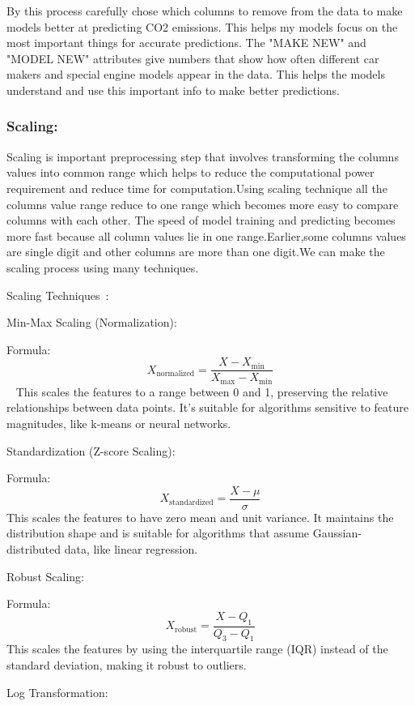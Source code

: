 \documentclass[12pt, a4paper,oneside]{book}
\numberwithin{equation}{section}
\begin{document}
By this process carefully chose which columns to remove from the data to make  models better at predicting CO2 emissions. This helps my models focus on the most important things for accurate predictions. The "MAKE NEW" and "MODEL NEW" attributes give numbers that show how often different car makers and special engine models appear in the data. This helps the models understand and use this important info to make better predictions.

\subsubsection{Scaling:}

Scaling is important preprocessing step that involves transforming the columns values into common range which helps to reduce the computational power requirement and reduce time for computation.Using scaling technique all the columns value range reduce to one range which becomes more easy to compare columns with each other. The speed of model training and predicting becomes more fast because all column values lie in one range.Earlier,some columns values are single digit and other columns are more than one digit.We can make the scaling process using many techniques.

\hfill\break
Scaling Techniques~\cite{ref17}:

\hfill\break
Min-Max Scaling (Normalization):

Formula:
\[
X_{\text{normalized}} = \frac{X - X_{\text{min}}}{X_{\text{max}} - X_{\text{min}}}
\]~\cite{ref17}
This scales the features to a range between 0 and 1, preserving the relative relationships between data points. It's suitable for algorithms sensitive to feature magnitudes, like k-means or neural networks.
\hfill\break

Standardization (Z-score Scaling):

Formula:
\[
X_{\text{standardized}} = \frac{X - \mu}{\sigma}
\]
This scales the features to have zero mean and unit variance. It maintains the distribution shape and is suitable for algorithms that assume Gaussian-distributed data, like linear regression.

\hfill\break
Robust Scaling:

Formula:
\[
X_{\text{robust}} = \frac{X - Q_1}{Q_3 - Q_1}
\]
This scales the features by using the interquartile range (IQR) instead of the standard deviation, making it robust to outliers.

\hfill\break
Log Transformation:
\end{document}
